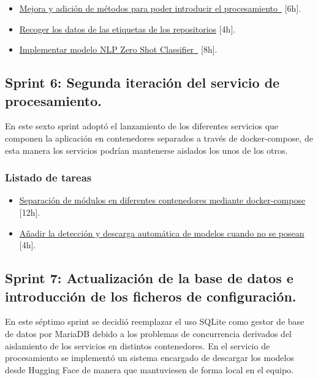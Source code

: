 \begin{itemize} \setlength\itemsep{0.2em}
    \item \href{https://github.com/MrpYA45/github-text-mining-tfg/issues/21}{Mejora y adición de métodos para poder introducir el procesamiento } [6h].
    \item \href{https://github.com/MrpYA45/github-text-mining-tfg/issues/22}{Recoger los datos de las etiquetas de los repositorios} [4h].
    \item \href{https://github.com/MrpYA45/github-text-mining-tfg/issues/23}{Implementar modelo NLP Zero Shot Classifier } [8h].

\end{itemize}
 
\subsection{Sprint 6: Segunda iteración del servicio de procesamiento.}

En este sexto sprint adoptó el lanzamiento de los diferentes servicios que componen la aplicación en contenedores separados a través de docker-compose, de esta manera los servicios podrían mantenerse aislados los unos de los otros.

\subsubsection{Listado de tareas}

\begin{itemize} \setlength\itemsep{0.2em}
    \item \href{https://github.com/MrpYA45/github-text-mining-tfg/issues/25}{Separación de módulos en diferentes contenedores mediante docker-compose} [12h].
    \item \href{https://github.com/MrpYA45/github-text-mining-tfg/issues/28}{Añadir la detección y descarga automática de modelos cuando no se posean} [4h].
\end{itemize}

\subsection{Sprint 7: Actualización de la base de datos e introducción de los ficheros de configuración.}

En este séptimo sprint se decidió reemplazar el uso SQLite como gestor de base de datos por MariaDB debido a los problemas de concurrencia derivados del aislamiento de los servicios en distintos contenedores. En el servicio de procesamiento se implementó un sistema encargado de descargar los modelos desde Hugging Face de manera que mantuviesen de forma local en el equipo.

